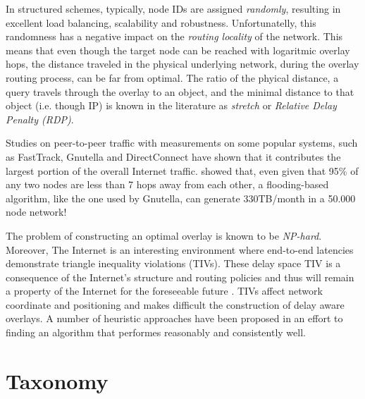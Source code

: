 \documentclass[a4paper,10pt]{article}
\begin{document}
In structured schemes, typically, node IDs are assigned \emph{randomly}, resulting in excellent load balancing, scalability and robustness. Unfortunatelly, this randomness has a negative impact on the \emph{routing locality} of the network. This means that even though the target node can be reached with logaritmic overlay hops, the distance traveled in the physical underlying network, during the overlay routing process, can be far from optimal. The ratio of the phyical distance, a query travels through the overlay to an object, and the minimal distance to that object (i.e. though IP) is known in the literature as \emph{stretch} or \emph{Relative Delay Penalty (RDP)}.

Studies on peer-to-peer traffic \cite{seroiu_analysiscds_2002, sen_analyzep2ptraffic_2004} with measurements on some popular systems, such as FastTrack, Gnutella and DirectConnect have shown that it contributes the largest portion of the overall Internet traffic. \cite{matei_mapgnutella_2002} showed that, even given that 95\% of any two nodes are less than 7 hops away from each other, a flooding-based algorithm, like the one used by Gnutella, can generate 330TB/month in a 50.000 node network!

The problem of constructing an optimal overlay is known to be \emph{NP-hard}\cite{chawathe_scattercast_2000}. Moreover, The Internet is an interesting environment where end-to-end latencies demonstrate triangle inequality violations (TIVs). These delay space TIV is a consequence of the Internet's structure and routing policies and thus will remain a property of the Internet for the foreseeable future \cite{zheng_irprtt_2005}. TIVs affect network coordinate \cite{cox_vivaldi_2004, wong_meridian_2005} and positioning \cite{ng_gnp_2001} and makes difficult the construction of delay aware overlays. A number of heuristic approaches have been proposed in an effort to finding an algorithm that performes reasonably and consistently well.

\section{Taxonomy}
\end{document}
